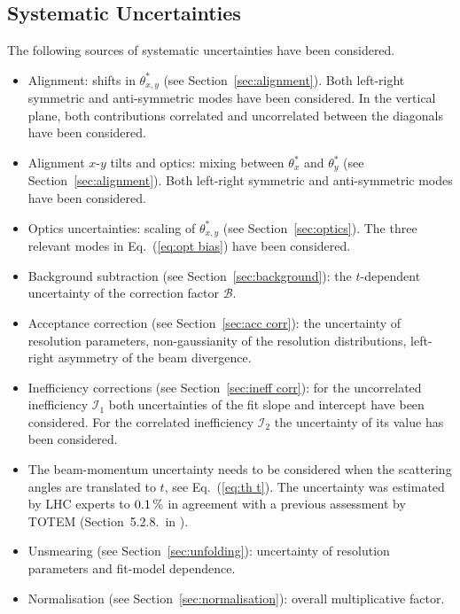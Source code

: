 
\subsection{Systematic Uncertainties}
\label{sec:systematics}

The following sources of systematic uncertainties have been considered.
\begin{itemize}

\item Alignment: shifts in $\theta^*_{x,y}$ (see Section~\ref{sec:alignment}). Both left-right symmetric and anti-symmetric modes have been considered. In the vertical plane, both contributions correlated and uncorrelated between the diagonals have been considered.

\item Alignment $x$-$y$ tilts and optics: mixing between $\theta^*_{x}$ and $\theta^*_{y}$ (see Section~\ref{sec:alignment}). Both left-right symmetric and anti-symmetric modes have been considered.

\item Optics uncertainties: scaling of $\theta^*_{x,y}$ (see Section~\ref{sec:optics}). The three relevant modes in Eq.~(\ref{eq:opt bias}) have been considered.

\item Background subtraction (see Section~\ref{sec:background}): the $t$-dependent uncertainty of the correction factor $\mathcal{B}$.

\item Acceptance correction (see Section~\ref{sec:acc corr}): the uncertainty of resolution parameters, non-gaussianity of the resolution distributions, left-right asymmetry of the beam divergence.

\item Inefficiency corrections (see Section~\ref{sec:ineff corr}): for the uncorrelated inefficiency $\mathcal{I}_1$ both uncertainties of the fit slope and intercept have been considered. For the correlated inefficiency $\mathcal{I}_2$ the uncertainty of its value has been considered.

\item The beam-momentum uncertainty needs to be considered when the scattering angles are translated to $t$, see Eq.~(\ref{eq:th t}). The uncertainty was estimated by LHC experts to $0.1\,{\rm \%}$ \cite{beam-mom-unc} in agreement with a previous assessment by TOTEM (Section~5.2.8.~in \cite{totem-8tev-90m}).

\item Unsmearing (see Section~\ref{sec:unfolding}): uncertainty of resolution parameters and fit-model dependence.

\item Normalisation (see Section~\ref{sec:normalisation}): overall multiplicative factor.

\end{itemize}

